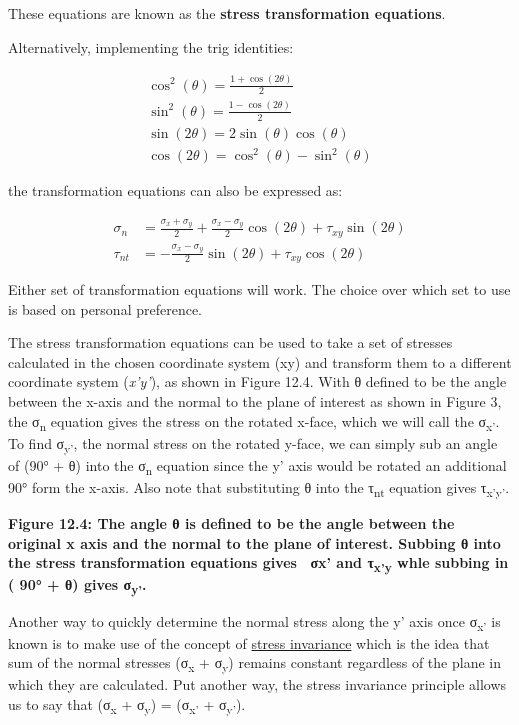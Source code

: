 \documentclass[
  letterpaper,
  DIV=11,
  numbers=noendperiod]{scrreprt}
\begin{document}
These equations are known as the \textbf{stress transformation
equations}.

Alternatively, implementing the trig identities:

\[
\begin{gathered}
\cos ^2(\theta)=\frac{1+\cos (2 \theta)}{2} \\
\sin ^2(\theta)=\frac{1-\cos (2 \theta)}{2} \\
\sin (2 \theta)=2 \sin (\theta) \cos (\theta) \\
\cos (2 \theta)=\cos ^2(\theta)-\sin ^2(\theta)
\end{gathered}
\]

the transformation equations can also be expressed as:

\[
\begin{aligned}
\sigma_n & =\frac{\sigma_x+\sigma_y}{2}+\frac{\sigma_x-\sigma_y}{2} \cos (2 \theta)+\tau_{x y} \sin (2 \theta) \\
\tau_{n t} & =-\frac{\sigma_x-\sigma_y}{2} \sin (2 \theta)+\tau_{x y} \cos (2 \theta)
\end{aligned}
\]

Either set of transformation equations will work. The choice over which
set to use is based on personal preference.

The stress transformation equations can be used to take a set of
stresses calculated in the chosen coordinate system (xy) and transform
them to a different coordinate system (\emph{x'y'}), as shown in Figure
12.4. With θ defined to be the angle between the x-axis and the normal
to the plane of interest as shown in Figure 3, the σ\textsubscript{n}
equation gives the stress on the rotated x-face, which we will call the
σ\textsubscript{x'}. To find σ\textsubscript{y'}, the normal stress on
the rotated y-face, we can simply sub an angle of (90° + θ) into the
σ\textsubscript{n} equation since the y' axis would be rotated an
additional 90° form the x-axis. Also note that substituting θ into the
τ\textsubscript{nt} equation gives τ\textsubscript{x'y'}.

\textbf{Figure 12.4: The angle θ is defined to be the angle between the
original x axis and the normal to the plane of interest. Subbing θ into
the stress transformation equations gives ~σx' and τ\textsubscript{x'y}
whle subbing in ( 90° + θ) gives σ\textsubscript{y'}.}

Another way to quickly determine the normal stress along the y' axis
once σ\textsubscript{x'} is known is to make use of the concept of
\ul{stress invariance} which is the idea that sum of the normal stresses
(σ\textsubscript{x} + σ\textsubscript{y}) remains constant regardless of
the plane in which they are calculated. Put another way, the stress
invariance principle allows us to say that (σ\textsubscript{x} +
σ\textsubscript{y}) = (σ\textsubscript{x'} + σ\textsubscript{y'}).
\end{document}
